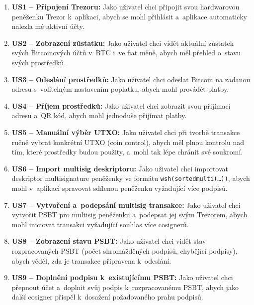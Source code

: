 \begin{enumerate}
  \item \textbf{US1 -- Připojení Trezoru:}
        Jako uživatel chci připojit svou hardwarovou peněženku Trezor k~aplikaci,
        abych se mohl přihlásit a~aplikace automaticky nalezla mé aktivní účty.

  \item \textbf{US2 -- Zobrazení zůstatku:}
        Jako uživatel chci vidět aktuální zůstatek svých Bitcoinových účtů v~BTC
        i~ve fiat měně, abych měl přehled o~stavu svých prostředků.

  \item \textbf{US3 -- Odeslání prostředků:}
        Jako uživatel chci odeslat Bitcoin na zadanou adresu s~volitelným nastavením
        poplatku, abych mohl provádět platby.

  \item \textbf{US4 -- Příjem prostředků:}
        Jako uživatel chci zobrazit svou přijímací adresu a~QR kód, abych mohl
        jednoduše přijímat platby.

  \item \textbf{US5 -- Manuální výběr UTXO:}
        Jako uživatel chci při tvorbě transakce ručně vybrat konkrétní UTXO
        (coin control), abych měl plnou kontrolu nad tím, které prostředky budou
        použity, a~mohl tak lépe chránit své soukromí.

  \item \textbf{US6 -- Import multisig deskriptoru:}
        Jako uživatel chci importovat deskriptor multisignature peněženky ve formátu
        \texttt{wsh(sortedmulti(\ldots))}, abych mohl v~aplikaci spravovat sdílenou
        peněženku vyžadující více podpisů.

  \item \textbf{US7 -- Vytvoření a~podepsání multisig transakce:}
        Jako uživatel chci vytvořit PSBT pro multisig peněženku a~podepsat jej svým
        Trezorem, abych mohl iniciovat transakci vyžadující souhlas více cosignerů.

  \item \textbf{US8 -- Zobrazení stavu PSBT:}
        Jako uživatel chci vidět stav rozpracovaných PSBT (počet shromážděných
        podpisů, chybějící podpisy), abych věděl, zda je transakce připravena
        k~odeslání.

  \item \textbf{US9 -- Doplnění podpisu k~existujícímu PSBT:}
        Jako uživatel chci přepnout účet a~doplnit svůj podpis k~rozpracovanému PSBT,
        abych jako další cosigner přispěl k~dosažení požadovaného prahu podpisů.


\end{enumerate}
